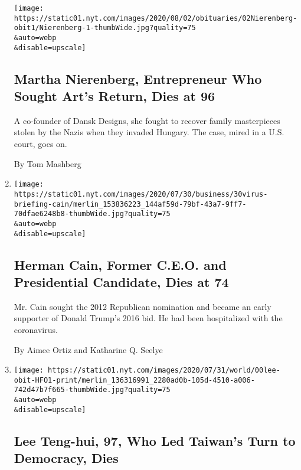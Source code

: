 \begin{enumerate}
  \texttt{[image: https://static01.nyt.com/images/2020/08/02/obituaries/02Nierenberg-obit1/Nierenberg-1-thumbWide.jpg?quality=75\\\&auto=webp\\\&disable=upscale]}

  \hypertarget{martha-nierenberg-entrepreneur-who-sought-arts-return-dies-at-96}{%
  \subsection{Martha Nierenberg, Entrepreneur Who Sought Art's Return,
  Dies at
  96}\label{martha-nierenberg-entrepreneur-who-sought-arts-return-dies-at-96}}

  A co-founder of Dansk Designs, she fought to recover family
  masterpieces stolen by the Nazis when they invaded Hungary. The case,
  mired in a U.S. court, goes on.

  By Tom Mashberg
\item
  \href{/2020/07/30/us/politics/herman-cain-dead.html}{}

  \texttt{[image: https://static01.nyt.com/images/2020/07/30/business/30virus-briefing-cain/merlin\_153836223\_144af59d-79bf-43a7-9ff7-70dfae6248b8-thumbWide.jpg?quality=75\\\&auto=webp\\\&disable=upscale]}

  \hypertarget{herman-cain-former-ceo-and-presidential-candidate-dies-at-74}{%
  \subsection{Herman Cain, Former C.E.O. and Presidential Candidate,
  Dies at
  74}\label{herman-cain-former-ceo-and-presidential-candidate-dies-at-74}}

  Mr. Cain sought the 2012 Republican nomination and became an early
  supporter of Donald Trump's 2016 bid. He had been hospitalized with
  the coronavirus.

  By Aimee Ortiz and Katharine Q. Seelye
\item
  \href{/2020/07/30/world/asia/lee-teng-hui-dead.html}{}

  \texttt{[image: https://static01.nyt.com/images/2020/07/31/world/00lee-obit-HFO1-print/merlin\_136316991\_2280ad0b-105d-4510-a006-742d47b7f665-thumbWide.jpg?quality=75\\\&auto=webp\\\&disable=upscale]}

  \hypertarget{lee-teng-hui-97-who-led-taiwans-turn-to-democracy-dies}{%
  \subsection{Lee Teng-hui, 97, Who Led Taiwan's Turn to Democracy,
  Dies}\label{lee-teng-hui-97-who-led-taiwans-turn-to-democracy-dies}}


\end{enumerate}
